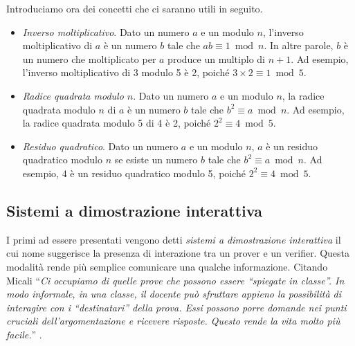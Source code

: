 \documentclass{article}
\theoremstyle{definition}
\begin{document}
Introduciamo ora dei concetti che ci saranno utili in seguito.
\begin{itemize}
    \item \emph{Inverso moltiplicativo}. Dato un numero $a$ e un modulo $n$, l'inverso moltiplicativo di $a$ è un numero $b$ tale che $ab \equiv 1 \bmod n$. In altre parole, $b$ è un numero che moltiplicato per $a$ produce un multiplo di $n+1$. Ad esempio, l'inverso moltiplicativo di 3 modulo 5 è 2, poiché $3 \times 2 \equiv 1 \bmod 5$.
    \item \emph{Radice quadrata modulo $n$}. Dato un numero $a$ e un modulo $n$, la radice quadrata modulo $n$ di $a$ è un numero $b$ tale che $b^2 \equiv a \bmod n$. Ad esempio, la radice quadrata modulo 5 di 4 è 2, poiché $2^2 \equiv 4 \bmod 5$.
    \item \emph{Residuo quadratico}. Dato un numero $a$ e un modulo $n$, $a$ è un residuo quadratico modulo $n$ se esiste un numero $b$ tale che $b^2 \equiv a \bmod n$. Ad esempio, 4 è un residuo quadratico modulo 5, poiché $2^2 \equiv 4 \bmod 5$.
\end{itemize}



\subsection{Sistemi a dimostrazione interattiva}
I primi ad essere presentati vengono detti \emph{sistemi a dimostrazione interattiva} il cui nome suggerisce la presenza di interazione tra un prover e un verifier. Questa modalità rende più semplice comunicare una qualche informazione. Citando Micali ``\emph{Ci occupiamo di quelle prove che possono essere ``spiegate in classe''. In modo informale, in una classe, il docente può sfruttare appieno la possibilità di interagire con i ``destinatari'' della prova. Essi possono porre domande nei punti cruciali dell'argomentazione e ricevere risposte. Questo rende la vita molto più facile.}'' \cite{micali}.
\end{document}
